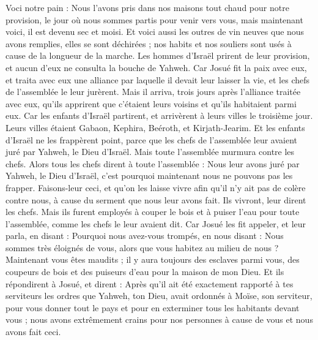 \begin{multicols}{2}
Voci notre pain : Nous l'avons pris dans nos maisons tout chaud pour notre provision, le jour où nous sommes partis pour venir vers vous, mais maintenant voici, il est devenu sec et moisi.
Et voici aussi les outres de vin neuves que nous avons remplies, elles se sont déchirées ; nos habits et nos souliers sont usés à cause de la longueur de la marche.
Les hommes d'Israël prirent de leur provision, et aucun d'eux ne consulta la bouche de Yahweh.
Car Josué fit la paix avec eux, et traita avec eux une alliance par laquelle il devait leur laisser la vie, et les chefs de l'assemblée le leur jurèrent.
Mais il arriva, trois jours après l'alliance traitée avec eux, qu'ils apprirent que c'étaient leurs voisins et qu'ils habitaient parmi eux.
Car les enfants d'Israël partirent, et arrivèrent à leurs villes le troisième jour. Leurs villes étaient Gabaon, Kephira, Beéroth, et Kirjath-Jearim.
Et les enfants d'Israël ne les frappèrent point, parce que les chefs de l'assemblée leur avaient juré par Yahweh, le Dieu d'Israël. Mais toute l'assemblée murmura contre les chefs.
Alors tous les chefs dirent à toute l'assemblée : Nous leur avons juré par Yahweh, le Dieu d'Israël, c'est pourquoi maintenant nous ne pouvons pas les frapper.
Faisons-leur ceci, et qu'on les laisse vivre afin qu'il n'y ait pas de colère contre nous, à cause du serment que nous leur avons fait.
Ils vivront, leur dirent les chefs. Mais ils furent employés à couper le bois et à puiser l'eau pour toute l'assemblée, comme les chefs le leur avaient dit.
Car Josué les fit appeler, et leur parla, en disant : Pourquoi nous avez-vous trompés, en nous disant : Nous sommes très éloignés de vous, alors que vous habitez au milieu de nous ?
Maintenant vous êtes maudits ; il y aura toujours des esclaves parmi vous, des coupeurs de bois et des puiseurs d'eau pour la maison de mon Dieu.
Et ils répondirent à Josué, et dirent : Après qu'il ait été exactement rapporté à tes serviteurs les ordres que Yahweh, ton Dieu, avait ordonnés à Moïse, son serviteur, pour vous donner tout le pays et pour en exterminer tous les habitants devant vous ; nous avons extrêmement crains pour nos personnes à cause de vous et nous avons fait ceci. 

\end{multicols}
